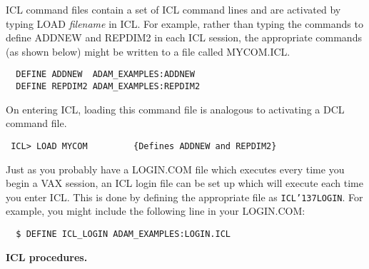 \documentclass[twoside,11pt]{article}
\renewcommand{\_}{{\tt\char'137}}
\begin{document}
ICL command files contain a set of ICL command lines
and are activated by typing LOAD {\sl filename} in ICL.
For example, rather than typing the commands to define ADDNEW and REPDIM2 
in each ICL session, the appropriate commands (as shown below) might be 
written to  a file called MYCOM.ICL.
\begin{verbatim}
  DEFINE ADDNEW  ADAM_EXAMPLES:ADDNEW
  DEFINE REPDIM2 ADAM_EXAMPLES:REPDIM2
\end{verbatim}
On entering ICL, loading this command file is analogous to activating a DCL
command file.
\begin{verbatim}
 ICL> LOAD MYCOM         {Defines ADDNEW and REPDIM2}
\end{verbatim}
Just as you probably have a  LOGIN.COM file which  executes every time
you begin a VAX session,
an ICL login file can be set up which will execute each time 
you enter ICL.
This is done by defining the appropriate file as {\tt ICL\_LOGIN}.
For example, you might include the following line in your LOGIN.COM:
\begin{verbatim}
  $ DEFINE ICL_LOGIN ADAM_EXAMPLES:LOGIN.ICL
\end{verbatim}


{\large\bf ICL procedures.}
\end{document}
